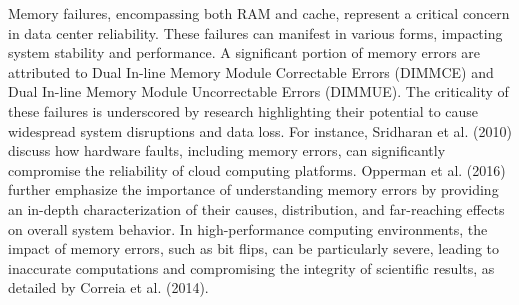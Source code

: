 Memory failures, encompassing both RAM and cache, represent a critical concern in data center reliability. These failures can manifest in various forms, impacting system stability and performance. A significant portion of memory errors are attributed to Dual In-line Memory Module Correctable Errors (DIMMCE) and Dual In-line Memory Module Uncorrectable Errors (DIMMUE). The criticality of these failures is underscored by research highlighting their potential to cause widespread system disruptions and data loss. For instance, Sridharan et al. (2010) discuss how hardware faults, including memory errors, can significantly compromise the reliability of cloud computing platforms. Opperman et al. (2016) further emphasize the importance of understanding memory errors by providing an in-depth characterization of their causes, distribution, and far-reaching effects on overall system behavior.  In high-performance computing environments, the impact of memory errors, such as bit flips, can be particularly severe, leading to inaccurate computations and compromising the integrity of scientific results, as detailed by Correia et al. (2014).

\begin{table}[ht]
\centering
\caption{Memory Failures (RAM \& Cache)}
\label{memory_failures}
\end{table}

